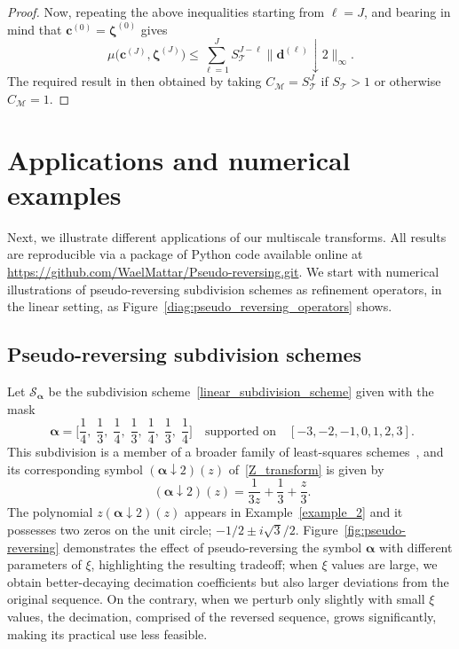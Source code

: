 \documentclass[12pt]{article}
\begin{document}
\begin{proof}
    Now, repeating the above inequalities starting from $\ell=J$, and bearing in mind that $\boldsymbol{c}^{(0)}=\boldsymbol{\zeta}^{(0)}$ gives
    \begin{equation*}
        \mu\big(\boldsymbol{c}^{(J)}, \boldsymbol{\zeta}^{(J)}\big)\leq \sum_{\ell=1}^J S_{\mathcal{T}}^{J-\ell}\|\boldsymbol{d}^{(\ell)}\downarrow 2\|_\infty.
    \end{equation*}
    The required result in then obtained by taking $C_{\mathcal{M}}=S_{\mathcal{T}}^J$ if $S_{\mathcal{T}}>1$ or otherwise $C_{\mathcal{M}}=1$.
\end{proof}


\section{Applications and numerical examples}\label{sec:numerical_examples}

Next, we illustrate different applications of our multiscale transforms. All results are reproducible via a package of Python code available online at \href{https://github.com/WaelMattar/Pseudo-reversing.git}{https://github.com/WaelMattar/Pseudo-reversing.git}. We start with numerical illustrations of pseudo-reversing subdivision schemes as refinement operators, in the linear setting, as Figure~\eqref{diag:pseudo_reversing_operators} shows.

\subsection{Pseudo-reversing subdivision schemes}
Let $\mathcal{S}_{\boldsymbol{\alpha}}$ be the subdivision scheme~\eqref{linear_subdivision_scheme} given with the mask
\begin{equation}~\label{LS_scheme_n_2_d_1}
    \boldsymbol{\alpha} = \bigg[\displaystyle \frac{1}{4},\; \frac{1}{3},\; \frac{1}{4},\; \frac{1}{3},\; \frac{1}{4},\; \frac{1}{3},\; \frac{1}{4}\bigg] \quad \text{supported on} \quad [-3,-2,-1,0,1,2,3].
\end{equation}
This subdivision is a member of a broader family of least-squares schemes~\cite{dyn2015univariate}, and its corresponding symbol $(\boldsymbol{\alpha}\downarrow 2)(z)$ of~\eqref{Z_transform} is given by
\begin{equation}~\label{even_symbol_of_n_2_d_1}
    (\boldsymbol{\alpha}\downarrow 2)(z) = \frac{1}{3z} + \frac{1}{3} + \frac{z}{3}.
\end{equation}
The polynomial $z(\boldsymbol{\alpha}\downarrow 2)(z)$ appears in Example~\ref{example_2} and it possesses two zeros on the unit circle; $-1/2 \pm i \sqrt{3}/2$. Figure~\ref{fig:pseudo-reversing} demonstrates the effect of pseudo-reversing the symbol $\boldsymbol{\alpha}$ with different parameters of $\xi$, highlighting the resulting tradeoff; when $\xi$ values are large, we obtain better-decaying decimation coefficients but also larger deviations from the original sequence. On the contrary, when we perturb only slightly with small $\xi$ values, the decimation, comprised of the reversed sequence, grows significantly, making its practical use less feasible.
\end{document}
